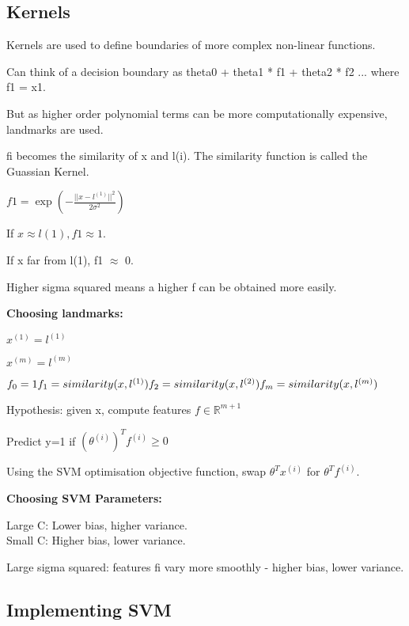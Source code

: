 \documentclass[12pt, a4paper]{article}
\begin{document}
{  \subsection{Kernels}
  
    Kernels are used to define boundaries of more complex non-linear functions.

    Can think of a decision boundary as theta0 + theta1 * f1 + theta2 * f2 ...
    where f1 = x1.
    
    But as higher order polynomial terms can be more computationally expensive,
    landmarks are used.
    
    fi becomes the similarity of x and l(i). The similarity function is called
    the Guassian Kernel.
    
    $f1 = \exp(- \frac{||x - l^{(1)}||^2}{2\sigma^2})$   

    If $x \approx l(1), f1 \approx 1$.

    If x far from l(1), f1 $\approx$ 0.

    Higher sigma squared means a higher f can be obtained more easily.

    \textbf{Choosing landmarks:}

    $x^{(1)} = l^{(1)}$ 

    $x^{(m)} = l^{(m)}$

    $f_0 = 1\\
    f_1 = similarity(x, l^{(1)})\\
    f_2 = similarity(x, l^{(2)})\\
    f_m = similarity(x, l^{(m)})$

    Hypothesis: given x, compute features $f\in\mathbb{R}^{m+1}$

    Predict y=1 if $(\theta^{(i)})^T f^{(i)} \geq 0$

    Using the SVM optimisation objective function, swap $\theta^Tx^{(i)}$ for 
    $\theta^Tf^{(i)}$.

    \textbf{Choosing SVM Parameters:}
    
    Large C: Lower bias, higher variance.\\
    Small C: Higher bias, lower variance.

    Large sigma squared: features fi vary more smoothly - higher bias, lower
    variance. 

  \subsection{Implementing SVM}

}
\end{document}
